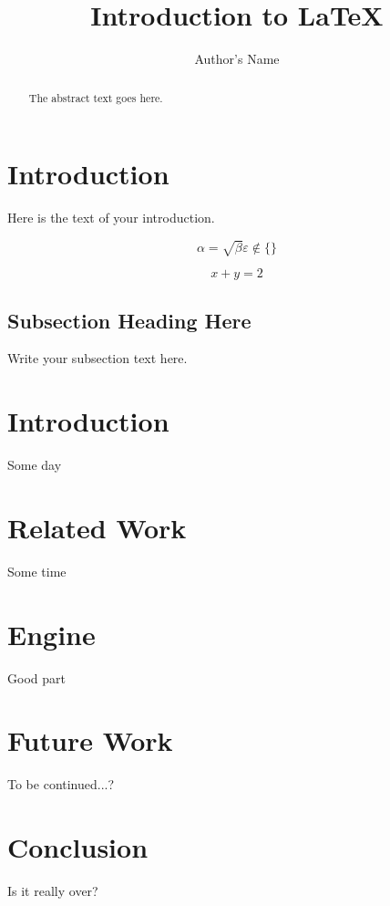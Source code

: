 \documentclass{article}
\begin{document}
\title{Introduction to \LaTeX{}}
\author{Author's Name}

\maketitle

\begin{abstract}
The abstract text goes here.
\end{abstract}

\newpage

\tableofcontents

\newpage

\section{Introduction}
Here is the text of your introduction.

\begin{equation}
    \label{simple_equation}
    \alpha = \sqrt{ \beta }
    \varepsilon \notin \{	\}
\end{equation}

\[
	x + y = 2
\]

\subsection{Subsection Heading Here}
Write your subsection text here.

\section{Introduction}
	Some day

\section{Related Work}
	Some time

\section{Engine}
	Good part

\section{Future Work}
	To be continued...?

\section{Conclusion}
	Is it really over?
\end{document}
